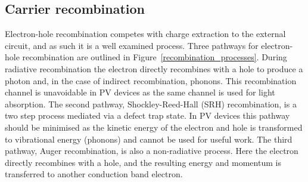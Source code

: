 

\subsection{Carrier recombination} \label{recombination}
Electron-hole recombination competes with charge extraction to the external circuit, and as such it is a well examined process. Three pathways for electron-hole recombination are outlined in Figure\ \ref{recombination_processes}. During radiative recombination the electron directly recombines with a hole to produce a photon and, in the case of indirect recombination, phonons. This recombination channel is unavoidable in PV devices as the same channel is used for light absorption. The second pathway, Shockley-Reed-Hall (SRH) recombination, is a two step process mediated via a defect trap state. In PV devices this pathway should be minimised as the kinetic energy of the electron and hole is transformed to vibrational energy (phonons) and cannot be used for useful work. The third pathway, Auger recombination, is also a non-radiative process. Here the electron directly recombines with a hole, and the resulting energy and momentum is transferred to another conduction band electron.

